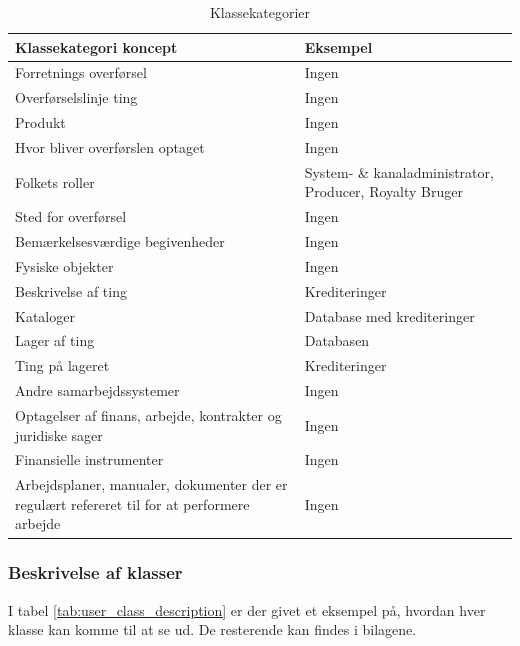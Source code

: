 \begin{table}[H]
    \begin{tabularx}{\textwidth}{|X|X|}
        \hline
        \textbf{Klassekategori koncept} & \textbf{Eksempel} \\
        \hline
        Forretnings overførsel & Ingen\\
        \hline
        Overførselslinje ting & Ingen\\
        \hline
        Produkt & Ingen \\
        \hline
        Hvor bliver overførslen optaget  & Ingen \\
        \hline
        Folkets roller & System- \& kanaladministrator, Producer, Royalty Bruger\\
        \hline
        Sted for overførsel & Ingen \\
        \hline
        Bemærkelsesværdige begivenheder & Ingen \\
        \hline
        Fysiske objekter & Ingen \\
        \hline
        Beskrivelse af ting & Krediteringer\\
        \hline
        Kataloger & Database med krediteringer\\
        \hline
        Lager af ting & Databasen\\
        \hline
        Ting på lageret & Krediteringer\\
        \hline
        Andre samarbejdssystemer & Ingen\\
        \hline
        Optagelser af finans, arbejde, kontrakter og juridiske sager & Ingen \\
        \hline
        Finansielle instrumenter & Ingen\\
        \hline
        Arbejdsplaner, manualer, dokumenter der er regulært refereret til for at performere arbejde & Ingen\\
        \hline
    \end{tabularx}
    \caption{Klassekategorier}
    \label{table:class_categories}
\end{table}

\subsubsection{Beskrivelse af klasser}
I tabel \ref{tab:user_class_description} er der givet et eksempel på, hvordan hver klasse kan komme til at se ud. De resterende kan findes i bilagene.
 
